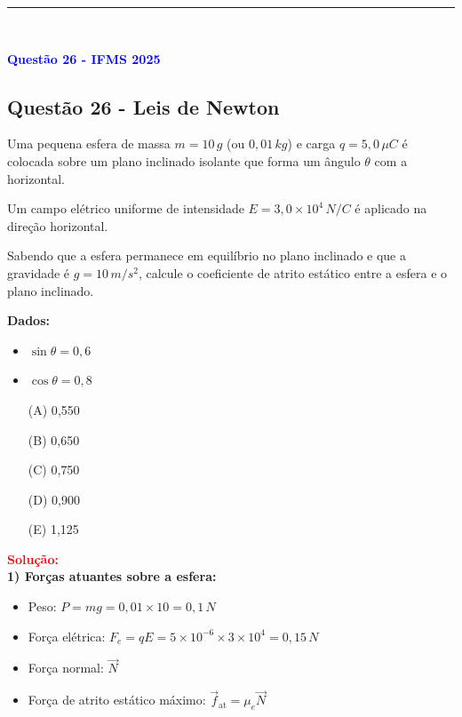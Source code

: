 \documentclass[a4paper,12pt]{article}
\begin{document}
\noindent\rule{\linewidth}{0.6pt}\\

\begin{flushleft}
\textbf{\textcolor{blue}{\Large Quest\~ao 26 - IFMS 2025}}\\
\subsection{Quest\~ao 26 - Leis de Newton}
Uma pequena esfera de massa $m = 10\,g$ (ou $0{,}01\,kg$) e carga $q = 5,0\,\mu C$ é colocada sobre um plano inclinado isolante 
que forma um ângulo $\theta$ com a horizontal. 

Um campo elétrico uniforme de intensidade $E = 3,0 \times 10^4\,N/C$ é aplicado na direção horizontal.

Sabendo que a esfera permanece em equilíbrio no plano inclinado e que a gravidade é $g = 10\,m/s^2$, calcule o coeficiente de atrito 
estático entre a esfera e o plano inclinado.

\textbf{Dados:}

\begin{itemize}
\item $\sin\theta = 0{,}6$
\item $\cos\theta = 0{,}8$
\end{itemize}

\begin{itemize}
\item[(A)] 0{,}550
\item[(B)] 0{,}650  
\item[(C)] 0{,}750
\item[(D)] 0{,}900
\item[(E)] 1,125
\end{itemize}

\vspace{0.5cm}

\textcolor{red}{\textbf{Solução:}}\\

\textbf{1) Forças atuantes sobre a esfera:}

\begin{itemize}
\item Peso: $P = mg = 0{,}01 \times 10 = 0{,}1\,N$
\item Força elétrica: $F_e = qE = 5 \times 10^{-6} \times 3 \times 10^4 = 0{,}15\,N$
\item Força normal: $\vec{N}$
\item Força de atrito estático máximo: $\vec{f}_{\text{at}} = \mu_e \vec{N}$
\end{itemize}


\end{flushleft}
\end{document}
